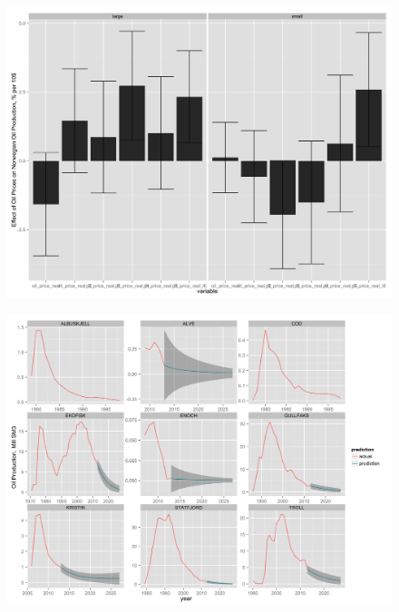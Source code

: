 \documentclass{beamer}
\begin{document}
\begin{frame}[plain]
	\begin{figure}
	\includegraphics[width=1\textwidth]{coeff_split_plot.png}
	\end{figure}
\end{frame}

\begin{frame}[plain]
	\begin{figure}
	\includegraphics[width=1\textwidth]{field_lev_forecast.png}
	\end{figure}
\end{frame}
\end{document}
